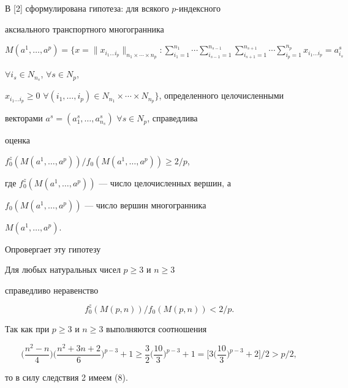 В [2] сформулирована гипотеза: для всякого $p$-индексного


аксиального транспортного многогранника


$M(a^1,\dotsc,a^p)=\Big\{x=\|x_{i_{1}\dotsc


i_{p}}\|_{n_1\times\dotsb\times n_{p}}:


\sum\limits_{i_1=1}^{n_1}\dotsb\sum\limits_{i_{s-1}=1}^{n_{s-1}}


\sum\limits_{i_{s+1}=1}^{n_{s+1}}


\dotsb\sum\limits_{i_p=1}^{n_p}x_{i_1\dotsc i_p}=a^s_{i_s}$


$\forall i_s\in N_{n_s}$, $\forall s\in N_p$,


$x_{i_1\dotsc i_p} \geq 0$ $\forall (i_1,\dotsc, i_p)\in


N_{n_1}\times \dotsb \times N_{n_p}\Big\}$, определенного целочисленными


векторами $a^s=(a^s_1, \dotsc, a^s_{n_s})$ $\forall s\in N_p$, справедлива


оценка


$f^z_0(M(a^1,\dotsc, a^p))/f_0(M(a^1,\dotsc, a^p))\geq 2/p$,


где $f^z_0(M(a^1,\dotsc, a^p))$ --- число целочисленных вершин, а


$f_0(M(a^1,\dotsc, a^p))$ --- число вершин многогранника


$M(a^1,\dotsc, a^p)$.


Опровергает эту гипотезу





\begin{cor}


Для любых натуральных чисел $p\geq 3$ и $n\geq 3$


справедливо неравенство


\begin{equation}


f^z_0(M(p,n))/f_0(M(p,n))<2/p.


\end{equation}


\end{cor}





\begin{pf}


Так как при $p\geq 3$ и $n\geq 3$ выполняются соотношения


$$


\bigg(\frac{n^2-n}{4}\bigg)\bigg(\frac{n^2+3n+2}{6}


\bigg)^{p-3}+1\ge \frac{3}{2}\bigg(\frac{10}{3}


\bigg)^{p-3}+1=\bigg[3\bigg(\frac{10}{3}


\bigg)^{p-3}+2\bigg]/2>p/2,


$$


то в силу следствия 2 имеем (8).


\end{pf}





